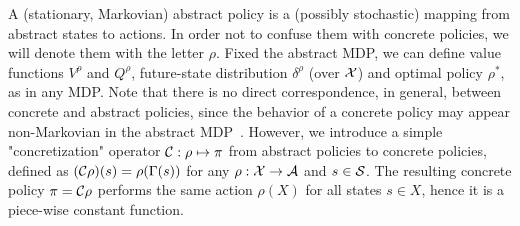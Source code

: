 %
A (stationary, Markovian) abstract policy is a (possibly stochastic) mapping from abstract states to actions. In order not to confuse them with concrete policies, we will denote them with the letter $\rho$. Fixed the abstract \ac{MDP}, we can define value functions $V^{\rho}$ and $Q^{\rho}$, future-state distribution $\delta^{\rho}$ (over $\mathcal{X}$) and optimal policy $\rho^{*}$, as in any \ac{MDP}. Note that there is no direct correspondence, in general, between concrete and abstract policies, since the behavior of a concrete policy may appear non-Markovian in the abstract \ac{MDP}~\citep{lihong2006towards}.
However, we introduce a simple "concretization" operator $\mathcal{C}: \rho \mapsto \pi$ from abstract policies to concrete policies, defined as
$(\mathcal{C}\rho)(s) = \rho(\Gamma(s))$
for any $\rho:\mathcal{X}\to\mathcal{A}$ and $s\in\mathcal{S}$. The resulting concrete policy $\pi = \mathcal{C}\rho$ performs the same action $\rho(X)$ for all states $s\in X$, hence it is a piece-wise constant function.


